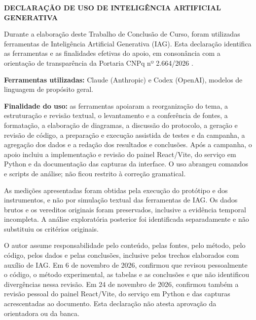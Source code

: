 \cleardoublepage
\thispagestyle{empty}

\begin{center}
\textbf{DECLARAÇÃO DE USO DE INTELIGÊNCIA ARTIFICIAL GENERATIVA}
\end{center}

\vspace{1.5cm}

Durante a elaboração deste Trabalho de Conclusão de Curso, foram utilizadas ferramentas de Inteligência Artificial Generativa (IAG). Esta declaração identifica as ferramentas e as finalidades efetivas do apoio, em consonância com a orientação de transparência da Portaria CNPq nº 2.664/2026 \cite{cnpq2026}.

\textbf{Ferramentas utilizadas:} Claude (Anthropic) e Codex (OpenAI), modelos de linguagem de propósito geral.

\textbf{Finalidade do uso:} as ferramentas apoiaram a reorganização do tema, a estruturação e revisão textual, o levantamento e a conferência de fontes, a formatação, a elaboração de diagramas, a discussão do protocolo, a geração e revisão de código, a preparação e execução assistida de testes e da campanha, a agregação dos dados e a redação dos resultados e conclusões. Após a campanha, o apoio incluiu a implementação e revisão do painel React/Vite, do serviço em Python e da documentação das capturas da interface. O uso abrangeu comandos e scripts de análise; não ficou restrito à correção gramatical.

As medições apresentadas foram obtidas pela execução do protótipo e dos instrumentos, e não por simulação textual das ferramentas de IAG. Os dados brutos e os vereditos originais foram preservados, inclusive a evidência temporal incompleta. A análise exploratória posterior foi identificada separadamente e não substituiu os critérios originais.

O autor assume responsabilidade pelo conteúdo, pelas fontes, pelo método, pelo código, pelos dados e pelas conclusões, inclusive pelos trechos elaborados com auxílio de IAG. Em 6 de novembro de 2026, confirmou que revisou pessoalmente o código, o método experimental, as tabelas e as conclusões e que não identificou divergências nessa revisão. Em 24 de novembro de 2026, confirmou também a revisão pessoal do painel React/Vite, do serviço em Python e das capturas acrescentadas ao documento. Esta declaração não atesta aprovação da orientadora ou da banca.

\cleardoublepage
